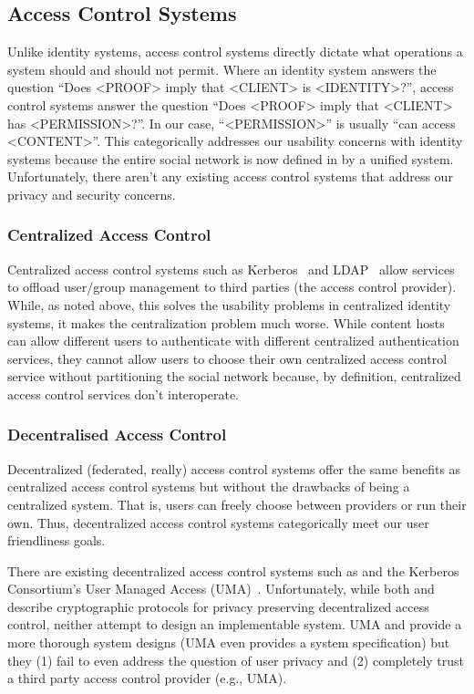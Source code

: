\documentclass[pdftex,12pt,a4papaer]{report}
\begin{document}
\subsection{Access Control Systems}

Unlike identity systems, access control systems directly dictate what operations
a system should and should not permit. Where an identity system answers the
question ``Does <PROOF> imply that <CLIENT> is <IDENTITY>?'', access control systems
answer the question ``Does <PROOF> imply that <CLIENT> has <PERMISSION>?''. In our
case, ``<PERMISSION>'' is usually ``can access <CONTENT>''. This categorically
addresses our usability concerns with identity systems because the entire social
network is now defined in by a unified system. Unfortunately, there aren't any
existing access control systems that address our privacy and security concerns.

\subsubsection{Centralized Access Control}

Centralized access control systems such as Kerberos~\cite{kerberos} and
LDAP~\cite{ldap} allow services to offload user/group management to third
parties (the access control provider). While, as noted above, this solves the
usability problems in centralized identity systems, it makes the centralization
problem much worse. While content hosts can allow different users to
authenticate with different centralized authentication services, they cannot
allow users to choose their own centralized access control service without
partitioning the social network because, by definition, centralized access
control services don't interoperate.

\subsubsection{Decentralised Access Control}

Decentralized (federated, really) access control systems offer the same benefits
as centralized access control systems but without the drawbacks of being a
centralized system. That is, users can freely choose between providers or run
their own. Thus, decentralized access control systems categorically meet our
user friendliness goals.

There are existing decentralized access control systems such as \cite{attrib}
\cite{privattrib} \cite{drbac} \cite{socnet} and the Kerberos Consortium's User
Managed Access (UMA)~\cite{uma}. Unfortunately, while both \cite{attrib} and
\cite{privattrib} describe cryptographic protocols for privacy preserving
decentralized access control, neither attempt to design an implementable system.
UMA\cite{uma} \cite{drbac} and \cite{socnet} provide a more thorough system
designs (UMA even provides a system specification) but they (1) fail to even
address the question of user privacy and (2) completely trust a third party
access control provider (e.g., UMA).
\end{document}
